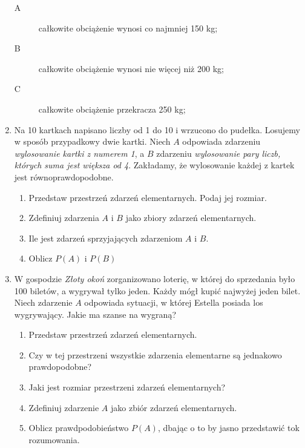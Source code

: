 \documentclass[twoside]{mwart}
\newcommand{\ans}[1]{}
\newcommand{\ans}[1]{\par\emph{Odpowiedź:} #1}
\begin{document}
\begin{enumerate}
\begin{description}
\item[A] całkowite obciążenie wynosi co najmniej 150 kg;
\item[B] całkowite obciążenie wynosi nie więcej niż 200 kg;
\item[C] całkowite obciążenie przekracza 250 kg;
\end{description}
\item Na 10 kartkach napisano liczby od 1 do 10 i wrzucono do pudełka. Losujemy w sposób przypadkowy dwie kartki. Niech $A$ odpowiada zdarzeniu \emph{wylosowanie kartki z numerem 1}, a $B$ zdarzeniu \emph{wylosowanie pary liczb, których suma jest większa od 4}. Zakładamy, że wylosowanie każdej z kartek jest równoprawdopodobne.
\begin{enumerate}
\item Przedstaw przestrzeń zdarzeń elementarnych. Podaj jej rozmiar. \ans{$\Omega=\{\omega_{\{i,j\}}|i,j\in\{1,\ldots,10\} \land i\neq j\}, \left|\Omega\right|={10 \choose 2}=45$}
\item Zdefiniuj zdarzenia $A$ i $B$ jako zbiory zdarzeń elementarnych. \ans{$A=\{\omega_{\{i,j\}}\in\Omega|i=1 \lor j=1\}$, $B=\{\omega_{\{i,j\}}\in\Omega|i+j>4\}$}
\item Ile jest zdarzeń sprzyjających zdarzeniom $A$ i $B$. \ans{$\left|A\right|=9$, $\left|B\right|=45-4=41$}
\item Oblicz $P(A)$ i $P(B)$ \ans{$P(A)=\frac{9}{45}, P(B)=\frac{41}{45}$}
\end{enumerate}
\item W gospodzie \emph{Złoty okoń} zorganizowano loterię, w której do sprzedania było 100 biletów, a wygrywał tylko jeden. Każdy mógł kupić najwyżej jeden bilet. Niech zdarzenie $A$ odpowiada sytuacji, w której Estella posiada los wygrywający. Jakie ma szanse na wygraną?
\begin{enumerate}%
\item Przedstaw przestrzeń zdarzeń elementarnych. \ans{$\Omega=\{\omega_n|n=1,2,\ldots,100\}$}%
\item Czy w tej przestrzeni wszystkie zdarzenia elementarne są jednakowo prawdopodobne? \ans{Tak}%
\item Jaki jest rozmiar przestrzeni zdarzeń elementarnych? \ans{$\left|\Omega\right|=100$}%
\item Zdefiniuj zdarzenie $A$ jako zbiór zdarzeń elementarnych. \ans{$A=\{\omega_1$\}}%
\item Oblicz prawdpodobieństwo $P(A)$, dbając o to by jasno przedstawić tok rozumowania. \ans{$P(A)=\frac{1}{100}$}%
\end{enumerate}%

\end{enumerate}
\end{document}

